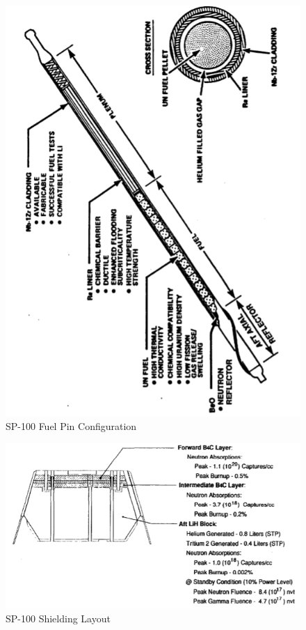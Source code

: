 \documentclass{article}
\begin{document}
\begin{figure}[]
	\centering
	\includegraphics[height=0.45\textheight]{fig/appH}
	\caption[SP-100 Fuel Pin Configuration]{SP-100 Fuel Pin Configuration~\cite{el1992decay}}
	\label{appH}
\end{figure}

\begin{figure}[]
	\centering
	\includegraphics[height=0.45\textheight]{fig/appI}
	\caption[SP-100 Shielding Layout]{SP-100 Shielding Layout~\cite{anderson1983power}}
	\label{appI}
\end{figure}
\end{document}
